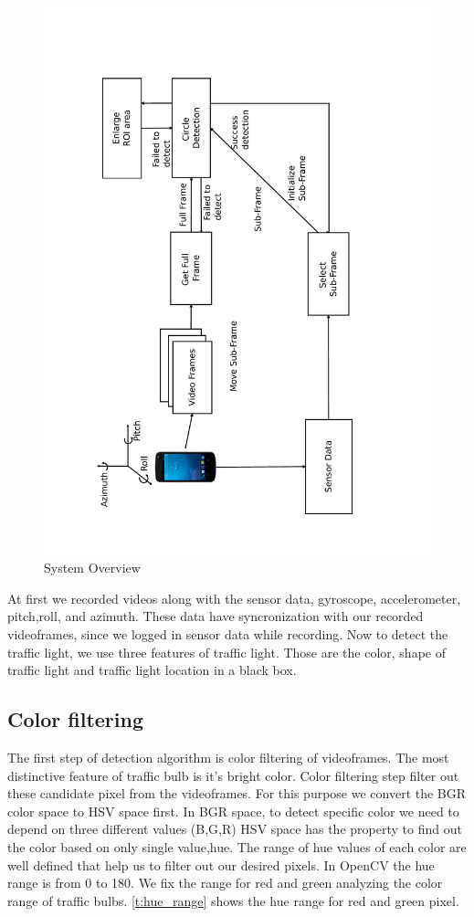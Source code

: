 \begin{figure}
\centering
\includegraphics[width=5.2in]{figures/sysdia.pdf}
\caption{System Overview}
\label{f:sys_dia}
\end{figure}

At first we recorded videos along with the sensor data, gyroscope, accelerometer, pitch,roll, and azimuth.
These data have syncronization with our recorded videoframes, since we logged in sensor data while recording.
Now to detect the traffic light, we use three features of traffic light.
Those are the color, shape of traffic light and traffic light location in a black box.

\subsection{Color filtering}
The first step of detection algorithm is color filtering of videoframes.
The most distinctive feature of traffic bulb is it's bright color.
Color filtering step filter out these candidate pixel from the videoframes.
For this purpose we convert the BGR color space to HSV space first.
In BGR space, to detect specific color we need to depend on three different values (B,G,R)
HSV space has the property to find out the color based on only single value,hue.
The range of hue values of each color are well defined that help us to filter out our desired pixels.
In OpenCV the hue range is from 0 to 180.
We fix the range for red and green analyzing the color range of traffic bulbs.
\ref{t:hue_range} shows the hue range for red and green pixel.

